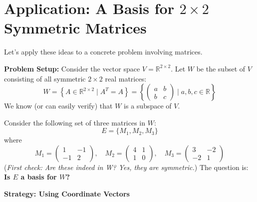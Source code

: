 \documentclass[11pt]{article}
\theoremstyle{definition}
\theoremstyle{remark}
\newcommand{\R}{\mathbb{R}}
\newcommand{\mat}[1]{\begin{pmatrix}#1\end{pmatrix}}
\begin{document}
\section{Application: A Basis for $2 \times 2$ Symmetric Matrices}

Let's apply these ideas to a concrete problem involving matrices.

\textbf{Problem Setup:}
Consider the vector space $V = \R^{2 \times 2}$. Let $W$ be the subset of $V$ consisting of all symmetric $2 \times 2$ real matrices:
\[ W = \left\{ A \in \R^{2 \times 2} \mid A^T = A \right\} = \left\{ \mat{a & b \\ b & c} \mid a, b, c \in \R \right\} \]
We know (or can easily verify) that $W$ is a subspace of $V$.

Consider the following set of three matrices in $W$:
\[ E = \{ M_1, M_2, M_3 \} \]
where
\[ M_1 = \mat{1 & -1 \\ -1 & 2}, \quad M_2 = \mat{4 & 1 \\ 1 & 0}, \quad M_3 = \mat{3 & -2 \\ -2 & 1} \]
(\emph{First check: Are these indeed in W? Yes, they are symmetric.})
The question is: \textbf{Is $E$ a basis for $W$?}

\textbf{Strategy: Using Coordinate Vectors}
\end{document}
